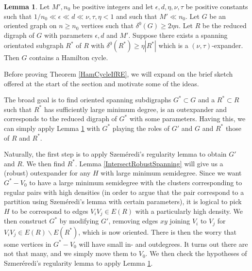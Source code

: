 \documentclass[10pt,letterpaper, reqno]{amsart}
\theoremstyle{definition}
\newtheorem{lemma}[thm]{Lemma}
\numberwithin{equation}{section}
\begin{document}
\begin{lemma}\label{HamExpandOld}
	Let $M', n_0$ be positive integers and let $\epsilon, d,\eta, \nu,\tau$ be positive constants such that $1/n_0 \ll \epsilon \ll d \ll \nu, \tau, \eta < 1$ and such that $M' \ll n_0$. Let $G$ be an oriented graph on $n\geq n_0$ vertices such that $\delta^0(G) \geq 2\eta n$. Let $R$ be the reduced digraph of $G$ with parameters $\epsilon, d$ and $M'$. Suppose there exists a spanning orientated subgraph $R^*$ of $R$ with $\delta^0(R^*) \geq \eta |R^*|$ which is a $(\nu, \tau)$-expander. Then $G$ contains a Hamilton cycle. 
\end{lemma}

\noindent Before proving Theorem \ref{HamCycleIfRE}, we will expand on the brief sketch offered at the start of the section and motivate some of the ideas. 

The broad goal is to find oriented spanning subdigraphs $G^* \subset G$ and a $R^* \subset R$ such that $R^*$ has sufficiently large minimum degree, is an outexpander and corresponds to the reduced digraph of $G^*$ with some parameters. Having this, we can simply apply Lemma \ref{HamExpandOld} with $G^*$ playing the roles of $G'$ and $G$ and $R^*$ those of $R$ and $R^*$. 

Naturally, the first step is to apply Szem\'{e}redi's regularity lemma to obtain $G'$ and $R$. We then find $R^*$. Lemma \ref{IntersectRobustSpanning} will give us a (robust) outexpander for any $H$ with large minimum semidegree. Since we want $G^*-V_0$ to have a large minimum semidegree with the clusters corresponding to regular pairs with high densities (in order to argue that the pair correspond to a partition using Szem\'{e}redi's lemma with certain parameters), it is logical to pick $H$ to be correspond to edges $V_iV_j \in E(R)$ with a particularly high density. We then construct $G^*$ by modifying $G'$, removing edges $xy$ joining $V_i$ to $V_j$ for $V_iV_j \in E(R)\backslash E(R^*)$, which is now oriented. There is then the worry that some vertices in $G^*-V_0$ will have small in- and outdegrees. It turns out there are not that many, and we simply move them to $V_0$. We then check the hypotheses of Szmer\'{e}redi's regularity lemma to apply Lemma \ref{HamExpandOld}. 
\end{document}
